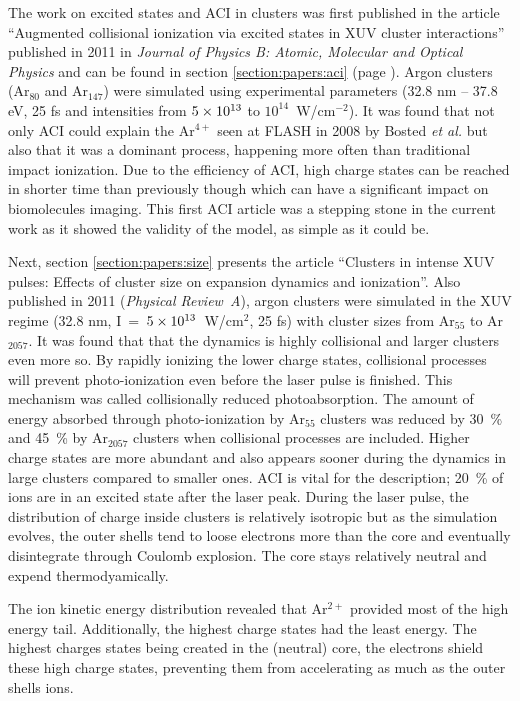 The work on excited states and ACI in clusters was first published in the article
``Augmented collisional ionization via excited states in XUV cluster
interactions'' published in 2011 in \textit{Journal of Physics B: Atomic,
Molecular and Optical Physics}\cite{Ackad2011a} and can be found in section
\ref{section:papers:aci} (page \pageref{section:papers:aci}). Argon clusters
(Ar$_{80}$ and Ar$_{147}$) were simulated using experimental parameters
(32.8 nm -- 37.8 eV, 25 fs and intensities from $\ten{5}{13}$ to
$10^{14}$~W/cm$^{-2}$). It was found that not only ACI could explain the
Ar$^{4+}$ seen at FLASH in 2008 by Bosted \textit{et al.} but also that it
was a dominant process, happening more often than traditional impact ionization.
Due to the efficiency of ACI, high charge states can be reached in shorter time
than previously though which can have a significant impact on biomolecules
imaging. This first ACI article was a stepping stone in the current work as it
showed the validity of the model, as simple as it could be.



Next, section \ref{section:papers:size} presents the article ``Clusters in
intense XUV pulses: Effects of cluster size on expansion dynamics and
ionization''. Also published in 2011 (\textit{Physical Review~A}\cite{Ackad2011b}),
argon clusters were simulated in the XUV regime (32.8 nm,
I~=~$\ten{5}{13}$~W/cm$^{2}$, 25 fs) with cluster sizes from Ar$_{55}$ to
Ar$_{2057}$. It was found that that the dynamics is highly collisional and
larger clusters even more so. By rapidly ionizing the lower charge states,
collisional processes will prevent photo-ionization even before the laser pulse
is finished. This mechanism was called collisionally reduced photoabsorption.
The amount of energy absorbed through photo-ionization by Ar$_{55}$ clusters was
reduced by 30~\% and 45~\% by Ar$_{2057}$ clusters when collisional processes
are included.
Higher charge states are more abundant and also appears sooner during the
dynamics in large clusters compared to smaller ones. ACI is vital for the
description; 20~\% of ions are in an excited state after the laser peak.
During the laser pulse, the distribution of charge inside clusters is
relatively isotropic but as the simulation evolves, the outer shells tend to
loose electrons more than the core and eventually disintegrate through Coulomb
explosion.
The core stays relatively neutral and expend thermodyamically.

The ion kinetic energy distribution revealed that Ar$^{2+}$  provided most of
the high energy tail. Additionally, the highest charge states had the least
energy. The highest charges states being created in the (neutral) core, the
electrons shield these high charge states, preventing them from accelerating
as much as the outer shells ions.

